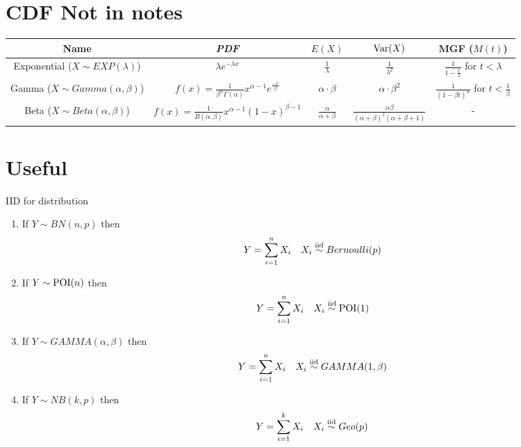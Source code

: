 \documentclass[16pt,a4paper]{article}
\begin{document}
\section*{CDF Not in notes}
\begin{tabular}{|c|c|c|c|c|}
    \hline 
    Name & \textit{PDF} & $E(X)$ & $\mathrm{Var}(X)$ & MGF ($M(t)$) \\ 
    \hline 
    Exponential ($X\sim EXP(\lambda)$) & $\lambda e^{-\lambda x}$ & $\frac{1}{\lambda}$ & $\frac{1}{\lambda^2}$ & $\frac{1}{1-\frac{t}{\lambda}}$ for $t<\lambda$ \\ 
    \hline 
    Gamma ($X\sim Gamma(\alpha, \beta)$) & $f(x) = \frac{1}{\beta^\alpha \Gamma(\alpha)}x^{\alpha -1}e^{\frac{-x}{\beta}}$ & $\alpha\cdot \beta$ & $\alpha \cdot \beta^2$ & $\frac{1}{(1-\beta t)^\alpha}$ for $t<\frac{1}{\beta}$ \\ 
    \hline 
    Beta ($X\sim Beta(\alpha, \beta)$) & $f(x) = \frac{1}{B(\alpha, \beta)}x^{\alpha -1}(1-x)^{\beta -1}$ & $\frac{\alpha}{\alpha+\beta}$ & $\frac{\alpha\beta}{(\alpha+\beta)^2(\alpha+\beta+1)}$ & - \\ 
    \hline 
\end{tabular} 
\newpage
\section*{Useful}
IID for distribution
\begin{enumerate}[\# 1]
    \item If $Y \sim BN(n,p)$ then 
        \begin{align*}
            Y = \sum_{i=1}^n X_i && X_i \overset{\mathrm{iid}}{\sim} Bernoulli(p)
        \end{align*}

    \item
        If $Y \sim \mathrm{POI}(n)$ then 
        \begin{align*}
            Y = \sum_{i=1}^n X_i  && X_i \overset{\mathrm{iid}}{\sim} \mathrm{POI}(1)
        \end{align*}


    \item If $Y \sim GAMMA(\alpha, \beta)$ then 
        \begin{align*}
            Y = \sum_{i=1}^n X_i && X_i \overset{\mathrm{iid}}{\sim} GAMMA(1, \beta)
        \end{align*}

    \item If $Y \sim NB(k,p)$ then 
        \begin{align*}
            Y = \sum_{i=1}^k X_i && X_i \overset{\mathrm{iid}}{\sim} Geo(p)
        \end{align*}
\end{enumerate}
\end{document}
